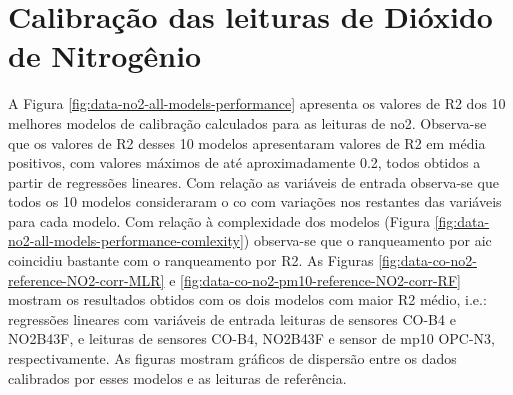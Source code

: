 \section{Calibração das leituras de Dióxido de Nitrogênio}

A Figura \ref{fig:data-no2-all-models-performance} apresenta os valores de R2 dos 10 melhores modelos de calibração calculados para as leituras de \acrshort{no2}. Observa-se que os valores de R2 desses 10 modelos apresentaram valores de R2 em média positivos, com valores máximos de até aproximadamente 0.2, todos obtidos a partir de regressões lineares. Com relação as variáveis de entrada observa-se que todos os 10 modelos consideraram o \acrshort{co} com variações nos restantes das variáveis para cada modelo. Com relação à complexidade dos modelos (Figura \ref{fig:data-no2-all-models-performance-comlexity}) observa-se que o ranqueamento por \acrshort{aic} coincidiu bastante com o ranqueamento por R2. As Figuras \ref{fig:data-co-no2-reference-NO2-corr-MLR} e \ref{fig:data-co-no2-pm10-reference-NO2-corr-RF} mostram os resultados obtidos com os dois modelos com maior R2 médio, i.e.: regressões lineares com variáveis de entrada leituras de sensores CO-B4 e NO2B43F, e leituras de sensores CO-B4, NO2B43F e sensor de \acrshort{mp10} OPC-N3, respectivamente. As figuras mostram gráficos de dispersão entre os dados calibrados por esses modelos e as leituras de referência.